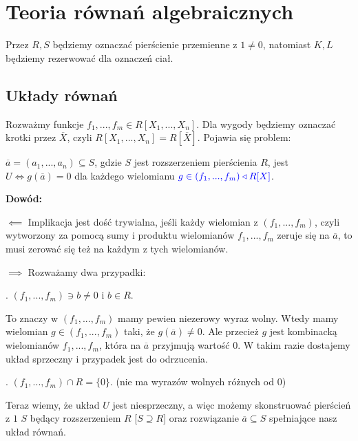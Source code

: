 \section{Teoria równań algebraicznych}

Przez $R, S$ będziemy oznaczać pierścienie przemienne z $1\neq0$, natomiast $K, L$ będziemy rezerwować dla oznaczeń ciał.

\subsection{Układy równań}

Rozważmy funkcje $f_1,...,f_m\in R[X_1, ..., X_n]$. Dla wygody będziemy oznaczać krotki przez $\overline X$, czyli $R[X_1,...,X_n]=R[\overline X]$. Pojawia się problem: 

\begin{fakt}
    $\overline a=(a_1,...,a_n)\subseteq S$, gdzie $S$ jest rozszerzeniem pierścienia $R$, jest  $U\iff g(\overline a)=0$ dla każdego wielomianu $\color{blue}g\in (f_1,...,f_m)\triangleleft R[X]$.
\end{fakt}

\textbf{Dowód:} 

$\impliedby$ Implikacja jest dość trywialna, jeśli każdy wielomian z $(f_1,...,f_m)$, czyli wytworzony za pomocą sumy i produktu wielomianów $f_1,...,f_m$ zeruje się na $\overline a$, to musi zerować się też na każdym z tych wielomianów.

$\implies$ Rozważamy dwa przypadki:

. $(f_1,...,f_m)\ni b\neq 0$ i $b\in R$. 

To znaczy w $(f_1,...,f_m)$ mamy pewien niezerowy wyraz wolny. Wtedy mamy wielomian $g\in(f_1,...,f_m)$ taki, że $g(\overline a)\neq 0$. Ale przecież $g$ jest kombinacką wielomianów $f_1,...,f_m$, która na $\overline a$ przyjmują wartość $0$. W takim razie dostajemy układ sprzeczny i przypadek jest do odrzucenia.

. $(f_1,...,f_m)\cap R=\{0\}$. (nie ma wyrazów wolnych różnych od $0$)

Teraz wiemy, że układ $U$ jest niesprzeczny, a więc możemy skonstruować pierścień z $1$ $S$ będący rozszerzeniem $R$ [$S\supseteq R$] oraz rozwiązanie $\overline a\subseteq S$ spełniające nasz układ równań.

